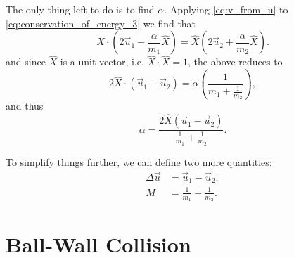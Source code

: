\documentclass{article}
\begin{document}
The only thing left to do is to find $\alpha$. Applying \autoref{eq:v_from_u} to \autoref{eq:conservation_of_energy_3} we find that
\begin{equation}
    \hat{X}\cdot\left(2\vec{u}_{1}-\frac{\alpha}{m_{1}}\hat{X}\right) = \hat{X}\left(2\vec{u}_{2}+\frac{\alpha}{m_{2}}\hat{X}\right).
    \label{eq:find_alpha}
\end{equation}
and since $\hat{X}$ is a unit vector, i.e. $\hat{X}\cdot\hat{X}=1$, the above reduces to
\begin{equation}
    2\hat{X}\cdot\left(\vec{u}_{1}-\vec{u}_{2}\right) = \alpha\left(\frac{1}{m_{1}+\frac{1}{m_{2}}}\right),
    \label{eq:reduction_1}
\end{equation}
and thus
\begin{equation}
\alpha = \frac{2\hat{X}\left(\vec{u}_{1}-\vec{u}_{2}\right)}{\frac{1}{m_{1}}+\frac{1}{m_{2}}}.
    \label{eq:reduction_2}
\end{equation}

To simplify things further, we can define two more quantities:
\begin{align}
    \Delta \vec{u} &= \vec{u}_{1}-\vec{u}_{2},\\
    M &= \frac{1}{m_{1}}+\frac{1}{m_{2}}.
\end{align}


\section{Ball-Wall Collision}
\end{document}

